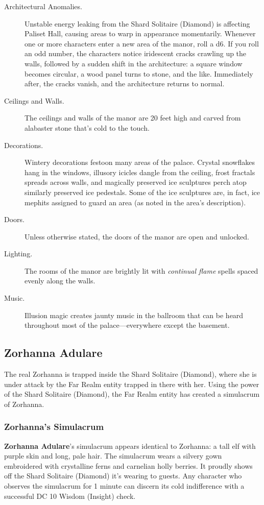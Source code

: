 \documentclass[10pt,a4paper,twoside,bg=print,twocolumn,openany,nodeprecatedcode]{dndbook}
\begin{document}
\begin{description}
\item[Architectural Anomalies.]
Unstable energy leaking from the Shard Solitaire (Diamond) is affecting Paliset Hall, causing areas to warp in appearance momentarily. Whenever one or more characters enter a new area of the manor, roll a d6. If you roll an odd number, the characters notice iridescent cracks crawling up the walls, followed by a sudden shift in the architecture: a square window becomes circular, a wood panel turns to stone, and the like. Immediately after, the cracks vanish, and the architecture returns to normal.
\item[Ceilings and Walls.]
The ceilings and walls of the manor are 20 feet high and carved from alabaster stone that's cold to the touch.
\item[Decorations.]
Wintery decorations festoon many areas of the palace. Crystal snowflakes hang in the windows, illusory icicles dangle from the ceiling, frost fractals spreads across walls, and magically preserved ice sculptures perch atop similarly preserved ice pedestals. Some of the ice sculptures are, in fact, ice mephits assigned to guard an area (as noted in the area's description).
\item[Doors.]
Unless otherwise stated, the doors of the manor are open and unlocked.
\item[Lighting.]
The rooms of the manor are brightly lit with \textit{continual flame} spells spaced evenly along the walls.
\item[Music.]
Illusion magic creates jaunty music in the ballroom that can be heard throughout most of the palace—everywhere except the basement.
\end{description}

\subsection{Zorhanna Adulare}
The real Zorhanna is trapped inside the Shard Solitaire (Diamond), where she is under attack by the Far Realm entity trapped in there with her. Using the power of the Shard Solitaire (Diamond), the Far Realm entity has created a simulacrum of Zorhanna.

\subsubsection{Zorhanna's Simulacrum}
\textbf{Zorhanna Adulare}'s simulacrum appears identical to Zorhanna: a tall elf with purple skin and long, pale hair. The simulacrum wears a silvery gown embroidered with crystalline ferns and carnelian holly berries. It proudly shows off the Shard Solitaire (Diamond) it's wearing to guests. Any character who observes the simulacrum for 1 minute can discern its cold indifference with a successful DC 10 Wisdom (Insight) check.
\end{document}
